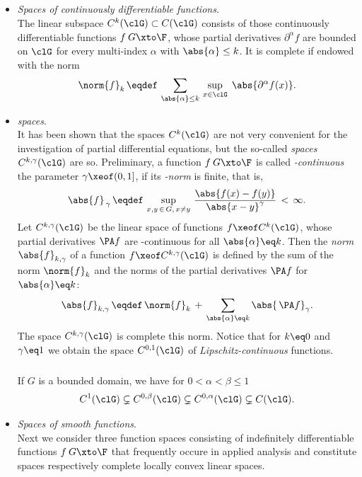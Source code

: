 \documentclass[11pt,twoside]{article}
\def\G{G}
\begin{document}
\subparagraph{}
\begin{itemize}[leftmargin=12pt,itemsep=5pt]
\item[5.] \textit{Spaces of continuously differentiable functions}.\\
The linear subspace $C^k(\clG) \subset C(\clG)$
consists of those continuously differentiable functions $f\:\G \xto \F$,
whose partial derivatives $\partial^{\alpha} f$ are bounded on $\clG$
for every multi-index $\alpha$ with $\abs{\alpha} \leq k$.
It is complete if endowed with the norm
\[
\norm{f}_k
\, \eqdef \,
\sum_{\abs{\alpha} \leq k} \,
\sup_{x \in \clG } \; \abs{\partial^{\alpha} f(x)} .
\]

\item[6.] \textit{{\HOELDER} spaces}.\\
It has been shown
that the spaces $C^k(\clG)$ are not very convenient
for the investigation of partial differential equations,
but the so-called \textit{{\HOELDER} spaces} $C^{k,\gamma}(\clG)$ are so.
Preliminary,
a function $f\:\G \xto \F$ is called \textit{{\HOELDER}-continuous}
{\wrt} the parameter $\gamma \xeof (0,1]$,
if its \textit{{\HOELDER}-norm} is finite,
that is,
\[
\abs{f} _{\,\gamma} \, \eqdef \,
\sup_{x,y \, \in \, \G, \, x \neq y} \,
\frac{\abs{f(x) - f(y)} } {\abs{x-y} ^{\gamma}} \, < \, \infty.
\]
Let $C^{k,\gamma}(\clG)$ be the linear space
of functions $f \xeof C^k(\clG)$,
whose partial derivatives $\PA f$
are {\HOELDER}-continuous for all $\abs{\alpha} \eq k$.
Then the \textit{{\HOELDER} norm} $\abs{f} _{k,\gamma}$
of a function $f \xeof C^{k,\gamma}(\clG)$ is defined
by the sum of the norm $\norm{f}_k$
and the {\HOELDER} norms of the partial derivatives $\PA f$
for $\abs{\alpha} \eq k$:
\[
\abs{f} _{k,\gamma}
\, \eqdef \,
\norm{f}_k
\, + \,
\sum_{\abs{\alpha} \eq k} \abs{\,\PA f} _\gamma.
\]
The space $C^{k,\gamma}(\clG)$ is complete {\wrt} this norm.
Notice that for $k \eq 0$ and $\gamma \eq 1$ we obtain the space
$C^{0,1}(\clG)$ of \textit{Lipschitz-continuous} functions.

\subparagraph{}
If $\G$ is a bounded domain, we have for $0 < \alpha < \beta \leq 1$
\[
C^1(\clG) \subsetneq
C^{0,\beta}(\clG) \subsetneq
C^{0,\alpha}(\clG) \subsetneq
C(\clG).
\]

\item[7.] \textit{Spaces of smooth functions}.\\
Next we consider three function spaces
consisting of indefinitely differentiable functions $f\:\G \xto \F$
that frequently occure in applied analysis
and constitute {\FRECHET} spaces respectively
complete locally convex linear spaces.


\end{itemize}
\end{document}

